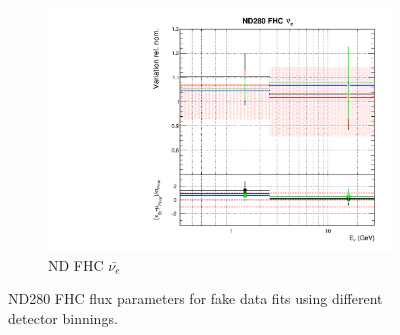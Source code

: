 \begin{figure}[!htbp]
\begin{subfigure}{0.49\textwidth}
  \includegraphics[width=0.99\linewidth]{figs/detcovbinflux_3}
  \caption{ND FHC $\bar{\nu_{e}}$}
\end{subfigure}
\caption{ND280 FHC flux parameters for fake data fits using different detector binnings.}
\label{fig:detcovbinfluxND}
\end{figure}

